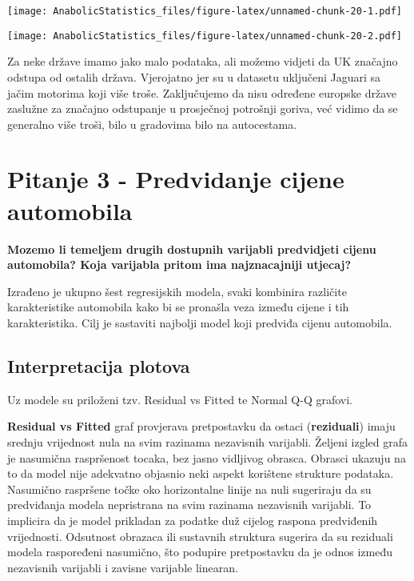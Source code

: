 \documentclass[
]{article}
\newenvironment{Shaded}{\begin{snugshade}}{\end{snugshade}}
\newcommand{\FloatTok}[1]{\textcolor[rgb]{0.00,0.00,0.81}{#1}}
\newcommand{\FunctionTok}[1]{\textcolor[rgb]{0.13,0.29,0.53}{\textbf{#1}}}
\newcommand{\NormalTok}[1]{#1}
\newcommand{\SpecialCharTok}[1]{\textcolor[rgb]{0.81,0.36,0.00}{\textbf{#1}}}
\begin{document}
\texttt{[image: AnabolicStatistics\_files/figure-latex/unnamed-chunk-20-1.pdf]}

\begin{Shaded}
\end{Shaded}

\texttt{[image: AnabolicStatistics\_files/figure-latex/unnamed-chunk-20-2.pdf]}

Za neke države imamo jako malo podataka, ali možemo vidjeti da UK
značajno odstupa od ostalih država. Vjerojatno jer su u datasetu
uključeni Jaguari sa jačim motorima koji više troše. Zaključujemo da
nisu određene europske države zaslužne za značajno odstupanje u
prosječnoj potrošnji goriva, već vidimo da se generalno više troši, bilo
u gradovima bilo na autocestama.

\section{Pitanje 3 - Predvidanje cijene
automobila}\label{pitanje-3---predvidanje-cijene-automobila}

\textbf{Mozemo li temeljem drugih dostupnih varijabli predvidjeti cijenu
automobila? Koja varijabla pritom ima najznacajniji utjecaj?}

Izrađeno je ukupno šest regresijskih modela, svaki kombinira različite
karakteristike automobila kako bi se pronašla veza između cijene i tih
karakteristika. Cilj je sastaviti najbolji model koji predviđa cijenu
automobila.

\subsection{Interpretacija plotova}\label{interpretacija-plotova}

Uz modele su priloženi tzv. Residual vs Fitted te Normal Q-Q grafovi.

\textbf{Residual vs Fitted} graf provjerava pretpostavku da ostaci
(\textbf{reziduali}) imaju srednju vrijednost nula na svim razinama
nezavisnih varijabli. Željeni izgled grafa je nasumična raspršenost
tocaka, bez jasno vidljivog obrasca. Obrasci ukazuju na to da model nije
adekvatno objasnio neki aspekt korištene strukture podataka. Nasumično
raspršene točke oko horizontalne linije na nuli sugeriraju da su
predviđanja modela nepristrana na svim razinama nezavisnih varijabli. To
implicira da je model prikladan za podatke duž cijelog raspona
predviđenih vrijednosti. Odsutnost obrazaca ili sustavnih struktura
sugerira da su reziduali modela raspoređeni nasumično, što podupire
pretpostavku da je odnos između nezavisnih varijabli i zavisne varijable
linearan.
\end{document}
